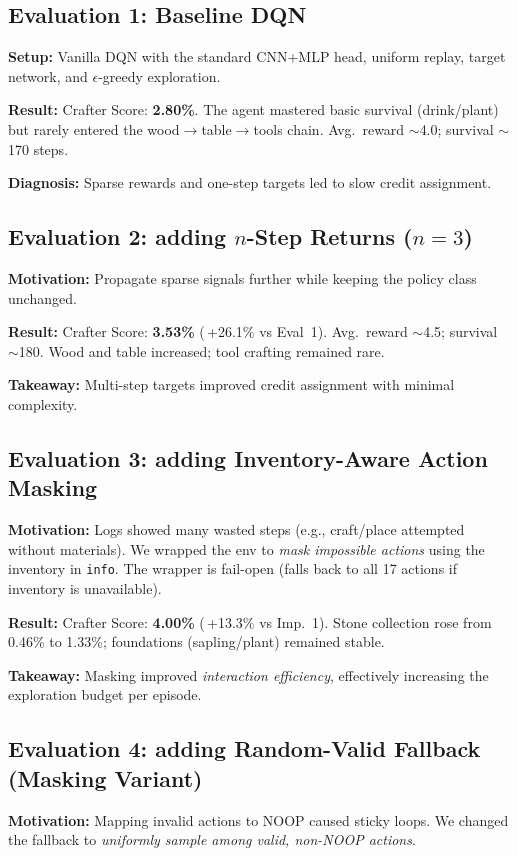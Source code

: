 \documentclass[conference]{IEEEtran}
\begin{document}
\subsection{Evaluation 1: Baseline DQN}
\textbf{Setup:} Vanilla DQN with the standard CNN+MLP head, uniform replay, target network, and $\epsilon$-greedy exploration.

\textbf{Result:} Crafter Score: \textbf{2.80\%}. The agent mastered basic survival (drink/plant) but rarely entered the wood$\rightarrow$table$\rightarrow$tools chain. Avg.\ reward $\sim$4.0; survival $\sim$170 steps.

\textbf{Diagnosis:} Sparse rewards and one-step targets led to slow credit assignment.

\subsection{Evaluation 2: adding $n$-Step Returns ($n{=}3$)}
\textbf{Motivation:} Propagate sparse signals further while keeping the policy class unchanged.

\textbf{Result:} Crafter Score: \textbf{3.53\%} (\,+26.1\% vs Eval~1). Avg.\ reward $\sim$4.5; survival $\sim$180. Wood and table increased; tool crafting remained rare.

\textbf{Takeaway:} Multi-step targets improved credit assignment with minimal complexity.

\subsection{Evaluation 3: adding Inventory-Aware Action Masking}
\textbf{Motivation:} Logs showed many wasted steps (e.g., craft/place attempted without materials). We wrapped the env to \emph{mask impossible actions} using the inventory in \texttt{info}. The wrapper is fail-open (falls back to all 17 actions if inventory is unavailable).

\textbf{Result:} Crafter Score: \textbf{4.00\%} (\,+13.3\% vs Imp.~1). Stone collection rose from 0.46\% to 1.33\%; foundations (sapling/plant) remained stable.

\textbf{Takeaway:} Masking improved \emph{interaction efficiency}, effectively increasing the exploration budget per episode.

\subsection{Evaluation 4: adding Random-Valid Fallback (Masking Variant)}
\textbf{Motivation:} Mapping invalid actions to NOOP caused sticky loops. We changed the fallback to \emph{uniformly sample among valid, non-NOOP actions}.
\end{document}
